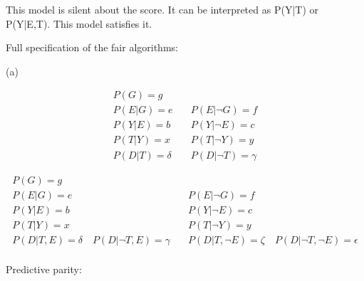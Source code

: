\documentclass{article}
\begin{document}
This model is silent about the score. It can be interpreted as P(Y|T) or P(Y|E,T). This model satisfies it. 


Full specification of the fair algorithms:

(a)

\begin{align*}
  P(G) = g & \quad \\
  P(E|G) = e & \quad P(E|\neg G) = f \\
  P(Y|E) = b & \quad P(Y|\neg E) = c \\
  P(T|Y) = x & \quad P(T|\neg Y) = y \\
  P(D|T) = \delta & \quad P(D|\neg T) = \gamma
\end{align*}


\begin{align*}
  P(G) = g & \quad \\
  P(E|G) = e & \quad P(E|\neg G) = f \\
  P(Y|E) = b & \quad P(Y|\neg E) = c \\
  P(T|Y) = x & \quad P(T|\neg Y) = y \\
  P(D|T, E) = \delta \quad P(D|\neg T, E) = \gamma & \quad P(D|T, \neg E) = \zeta \quad P(D|\neg T, \neg E) = \epsilon \\
\end{align*}



Predictive parity: \\
\end{document}
